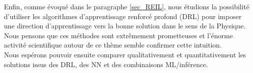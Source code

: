 \documentclass[a4paper,12pt]{article}
\numberwithin{equation}{section} %
\begin{document}
\noindent Enfin, comme évoqué dans le paragraphe \eqref{sec_REIL}, nous étudions la possibilité d'utiliser les algorithmes d'apprentissage renforcé profond (DRL) pour imposer une direction d'apprentissage vers la bonne solution dans le sens de la Physique. Nous pensons que ces méthodes sont extrêmement prometteuses et l'énorme activité scientifique autour de ce thème semble confirmer cette intuition.\\
Nous espérons pouvoir ensuite comparer qualitativement et quantitativement les solutions issus des DRL, des NN et des combinaisons ML/inférence.\\





\pagebreak



\end{document}
